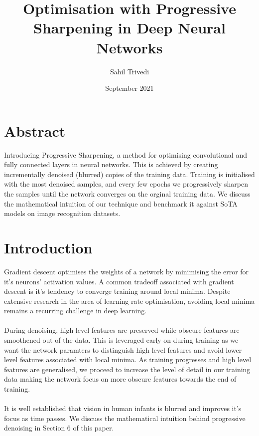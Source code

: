 \documentclass[12pt]{article}
\date{September 2021}
\title{Optimisation with Progressive Sharpening in Deep Neural Networks}
\author{Sahil Trivedi}
\begin{document}
	\maketitle
	
	\begin{multicols}{2}
		
		\section{Abstract}
		Introducing Progressive Sharpening, a method for optimising convolutional and fully connected layers in neural networks. This is achieved by creating incrementally denoised (blurred) copies of the training data. Training is initialised with the most denoised samples, and every few epochs we progressively sharpen the samples until the network converges on the orginal training data. We discuss the mathematical intuition of our technique and benchmark it against SoTA models on image recognition datasets. 
		
		\section{Introduction}
		Gradient descent optimises the weights of a network by minimising the error for it's neurons' activation values. A common tradeoff associated with gradient descent is it's tendency to converge training around local minima. Despite extensive research in the area of learning rate optimisation, avoiding local minima remains a recurring challenge in deep learning.
		\\\\
		During denoising, high level features are preserved while obscure features are smoothened out of the data. This is leveraged early on during training as we want the network paramters to distinguish high level features and avoid lower level features associated with local minima. As training progresses and high level features are generalised, we proceed to increase the level of detail in our training data making the network focus on more obscure features towards the end of training.
		\\\\
		It is well established that vision in human infants is blurred and improves it's focus as time passes. We discuss the mathematical intuition behind progressive denoising in Section 6 of this paper.  
		

\end{multicols}
\end{document}

